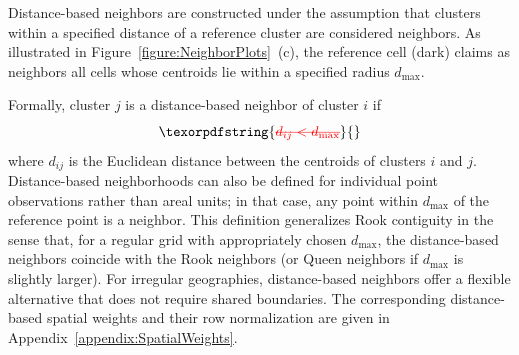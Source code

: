 \documentclass{article}[11pt]
\makeatletter
\providecommand{\DIFaddtex}[1]{{\protect\color{blue}\uwave{#1}}} %
\providecommand{\DIFdeltex}[1]{{\protect\color{red}\sout{#1}}} %
\providecommand{\DIFaddbegin}{} %
\providecommand{\DIFaddend}{} %
\providecommand{\DIFdelbegin}{} %
\providecommand{\DIFdelend}{} %
\providecommand{\DIFadd}[1]{\texorpdfstring{\DIFaddtex{#1}}{#1}} %
\providecommand{\DIFdel}[1]{\texorpdfstring{\DIFdeltex{#1}}{}} %
\providecommand{\DIFscaledelfig}{0.5}
\newlength{\DIFdelgraphicswidth} %
\newlength{\DIFdelgraphicsheight} %
\providecommand{\DIFaddincludegraphics}[2][]{{\color{blue}\fbox{\DIFOincludegraphics[#1]{#2}}}} %
\providecommand{\DIFdelincludegraphics}[2][]{%
\sbox{\DIFdelgraphicsbox}{\DIFOincludegraphics[#1]{#2}}%
\settoboxwidth{\DIFdelgraphicswidth}{\DIFdelgraphicsbox} %
\settoboxtotalheight{\DIFdelgraphicsheight}{\DIFdelgraphicsbox} %
\scalebox{\DIFscaledelfig}{%
\parbox[b]{\DIFdelgraphicswidth}{\usebox{\DIFdelgraphicsbox}\\[-\baselineskip] \rule{\DIFdelgraphicswidth}{0em}}\llap{\resizebox{\DIFdelgraphicswidth}{\DIFdelgraphicsheight}{%
\setlength{\unitlength}{\DIFdelgraphicswidth}%
\begin{picture}(1,1)%
\thicklines\linethickness{2pt} %
{\color[rgb]{1,0,0}\put(0,0){\framebox(1,1){}}}%
{\color[rgb]{1,0,0}\put(0,0){\line( 1,1){1}}}%
{\color[rgb]{1,0,0}\put(0,1){\line(1,-1){1}}}%
\end{picture}%
}\hspace*{3pt}}} %
} %
\DeclareRobustCommand{\DIFaddbegin}{\DIFOaddbegin \let\includegraphics\DIFaddincludegraphics} %
\DeclareRobustCommand{\DIFaddend}{\DIFOaddend \let\includegraphics\DIFOincludegraphics} %
\DeclareRobustCommand{\DIFdelbegin}{\DIFOdelbegin \let\includegraphics\DIFdelincludegraphics} %
\DeclareRobustCommand{\DIFdelend}{\DIFOaddend \let\includegraphics\DIFOincludegraphics} %
\let\sout@orig\sout %
\renewcommand{\sout}[1]{\ifmmode\text{\sout@orig{\ensuremath{#1}}}\else\sout@orig{#1}\fi} %
\makeatother
\begin{document}
Distance-based neighbors\cite{fotheringham_sage_2009} are constructed under the assumption that clusters within a specified distance of a reference cluster are considered neighbors. As illustrated in Figure~\ref{figure:NeighborPlots}~(c), the reference cell (dark) claims as neighbors all cells whose centroids lie within a specified radius $d_{\max}$. \DIFdelbegin %

\DIFdelend Formally, cluster $j$ is a distance-based neighbor of cluster $i$ if \DIFdelbegin \begin{displaymath}
    \DIFdel{d_{ij} < d_{\max}
}\end{displaymath}%
\DIFdelend \DIFaddbegin \DIFadd{$d_{ij} < d_{\max}$, }\DIFaddend where $d_{ij}$ is the Euclidean distance between the centroids of clusters $i$ and $j$. Distance-based neighborhoods can also be defined for individual point observations rather than areal units; in that case, any point within $d_{\max}$ of the reference point is a neighbor. This definition generalizes Rook contiguity in the sense that, for a regular grid with appropriately chosen $d_{\max}$, the distance-based neighbors coincide with the Rook neighbors (or Queen neighbors if $d_{\max}$ is slightly larger). For irregular geographies, distance-based neighbors offer a flexible alternative that does not require shared boundaries. The corresponding distance-based spatial weights and their row normalization are given in Appendix~\ref{appendix:SpatialWeights}.
\end{document}
